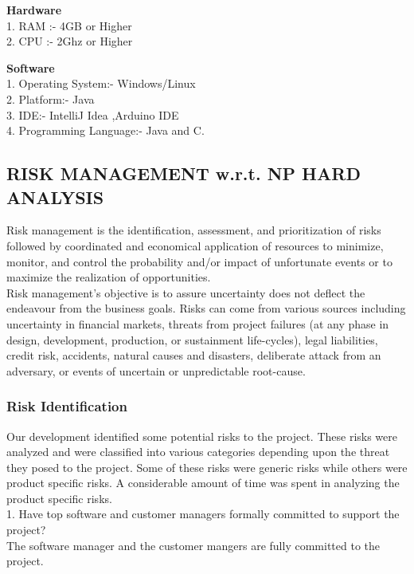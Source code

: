 \documentclass[12pt,a4paper]
{article}
\numberwithin{table}{section}
\begin{document}
{{{{{\vspace{0.2 in}
\textbf{Hardware} \\
1.	RAM :- 4GB or Higher \\
2.	CPU :- 2Ghz or Higher 
 
 \vspace{0.2 in}
\textbf{Software} \\
1.	Operating System:- Windows/Linux \\
2.	Platform:- Java  \\
3.	IDE:- IntelliJ Idea ,Arduino IDE  \\
4.	Programming Language:- Java and C.


\newpage


\subsection{RISK MANAGEMENT w.r.t. NP HARD ANALYSIS}
Risk management is the identification, assessment, and prioritization of risks followed by coordinated and economical application of resources to minimize, monitor, and control the probability and/or impact of unfortunate events or to maximize the realization of opportunities. \\ 
Risk management’s objective is to assure uncertainty does not deflect the endeavour from the business goals.  Risks can come from various sources including uncertainty in financial markets, threats from project failures (at any phase in design, development, production, or sustainment life-cycles), legal liabilities, credit risk, accidents, natural causes and disasters, deliberate attack from an adversary, or events of uncertain or unpredictable root-cause.

\subsubsection{Risk Identification}

Our development identified some potential risks to the project. These risks were analyzed and were classified into various categories depending upon the threat they posed to the project. Some of these risks were generic risks while others were product specific risks. A considerable amount of time was spent in analyzing the product specific risks.\\

1.	Have top software and customer managers formally committed to support the project?\\
The software manager and the customer mangers are fully committed to the project.\\

}}}}}
\end{document}
